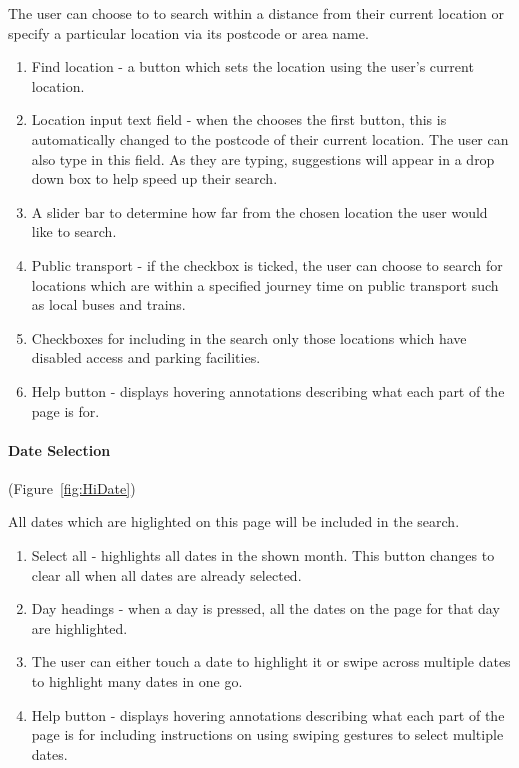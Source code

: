 The user can choose to to search within a distance from their current
location or specify a particular location via its postcode or area
name.
\begin{enumerate}
	\item Find location - a button which sets the location using the user's
	      current location.
	\item Location input text field - when the chooses the first button, this
	      is automatically changed to the postcode of their current location.
	      The user can also type in this field. As they are typing, suggestions
	      will appear in a drop down box to help speed up their search.
	\item A slider bar to determine how far from the chosen location the user
	      would like to search. 
	\item Public transport - if the checkbox is ticked, the user can choose
	      to search for locations which are within a specified journey time
	      on public transport such as local buses and trains.
	\item Checkboxes for including in the search only those locations which
	      have disabled access and parking facilities.
	\item Help button - displays hovering annotations describing what each part
	      of the page is for.
\end{enumerate}

\paragraph{Date Selection}

(Figure~\ref{fig:HiDate})


All dates which are higlighted on this page will be included in the
search.
\begin{enumerate}
	\item Select all - highlights all dates in the shown month. This button
	      changes to clear all when all dates are already selected.
	\item Day headings - when a day is pressed, all the dates on the page for
	      that day are highlighted.
	\item The user can either touch a date to highlight it or swipe across multiple
	      dates to highlight many dates in one go.
	\item Help button - displays hovering annotations describing what each part
	      of the page is for including instructions on using swiping gestures
	      to select multiple dates.
\end{enumerate}

